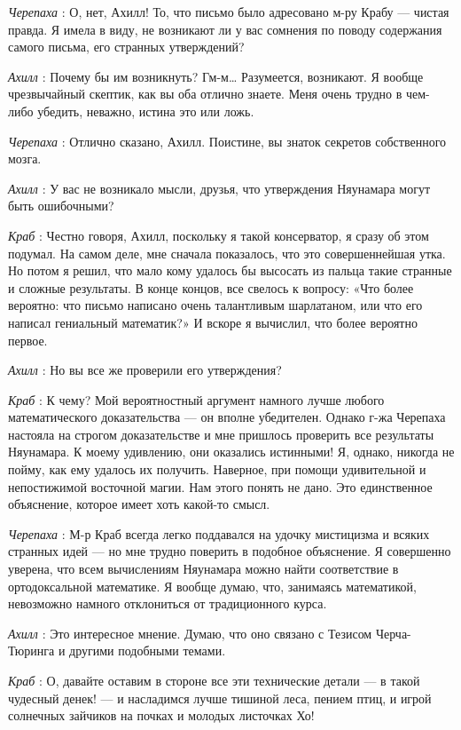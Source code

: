 \emph{Черепаха} : О, нет, Ахилл! То, что письмо было адресовано м-ру Крабу --- чистая правда. Я имела в виду, не возникают ли у вас сомнения по поводу содержания самого письма, его странных утверждений?

\emph{Ахилл} : Почему бы им возникнуть? Гм-м\ldots{} Разумеется, возникают. Я вообще чрезвычайный скептик, как вы оба отлично знаете. Меня очень трудно в чем-либо убедить, неважно, истина это или ложь.

\emph{Черепаха} : Отлично сказано, Ахилл. Поистине, вы знаток секретов собственного мозга.

\emph{Ахилл} : У вас не возникало мысли, друзья, что утверждения Няунамара могут быть ошибочными?

\emph{Краб} : Честно говоря, Ахилл, поскольку я такой консерватор, я сразу об этом подумал. На самом деле, мне сначала показалось, что это совершеннейшая утка. Но потом я решил, что мало кому удалось бы высосать из пальца такие странные и сложные результаты. В конце концов, все свелось к вопросу: «Что более вероятно: что письмо написано очень талантливым шарлатаном, или что его написал гениальный математик?» И вскоре я вычислил, что более вероятно первое.

\emph{Ахилл} : Но вы все же проверили его утверждения?

\emph{Краб} : К чему? Мой вероятностный аргумент намного лучше любого математического доказательства --- он вполне убедителен. Однако г-жа Черепаха настояла на строгом доказательстве и мне пришлось проверить все результаты Няунамара. К моему удивлению, они оказались истинными! Я, однако, никогда не пойму, как ему удалось их получить. Наверное, при помощи удивительной и непостижимой восточной магии. Нам этого понять не дано. Это единственное объяснение, которое имеет хоть какой-то смысл.

\emph{Черепаха} : М-р Краб всегда легко поддавался на удочку мистицизма и всяких странных идей --- но мне трудно поверить в подобное объяснение. Я совершенно уверена, что всем вычислениям Няунамара можно найти соответствие в ортодоксальной математике. Я вообще думаю, что, занимаясь математикой, невозможно намного отклониться от традиционного курса.

\emph{Ахилл} : Это интересное мнение. Думаю, что оно связано с Тезисом Черча-Тюринга и другими подобными темами.

\emph{Краб} : О, давайте оставим в стороне все эти технические детали --- в такой чудесный денек! --- и насладимся лучше тишиной леса, пением птиц, и игрой солнечных зайчиков на почках и молодых листочках Хо!

